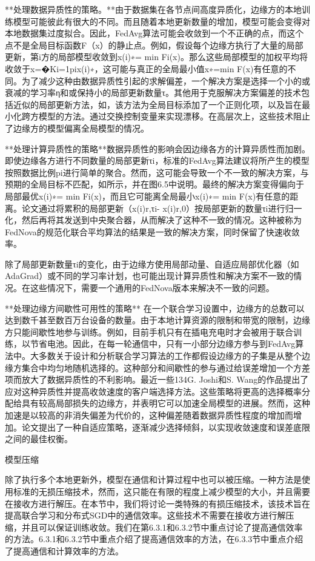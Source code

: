 **处理数据异质性的策略。**由于数据集在各节点间高度异质化，边缘方的本地训练模型可能彼此有很大的不同。而且随着本地更新数量的增加，模型可能会变得对本地数据集过度拟合。因此，FedAvg算法可能会收敛到一个不正确的点，而这个点不是全局目标函数F（x）的静止点。例如，假设每个边缘方执行了大量的局部更新，第i方的局部模型收敛到x(i)∗= min Fi(x)。那么这些局部模型的加权平均将收敛于x=�Ki=1pix(i)∗，这可能与真正的全局最小值x∗=min F(x)有任意的不同。为了减少这种由数据异质性引起的求解偏差，一个解决方案是选择一个小的或衰减的学习率η和或保持小的局部更新数量τ。其他用于克服解决方案偏差的技术包括近似的局部更新方法，如，该方法为全局目标添加了一个正则化项，以及旨在最小化跨方模型的方法。通过交换控制变量来实现漂移。在高层次上，这些技术阻止了边缘方的模型偏离全局模型的情况。

**处理计算异质性的策略**数据异质性的影响会因边缘各方的计算异质性而加剧。即使边缘各方进行不同数量的局部更新τi，标准的FedAvg算法建议将所产生的模型按照数据比例pi进行简单的聚合。然而，这可能会导致一个不一致的解决方案，与预期的全局目标不匹配，如所示，并在图6.5中说明。最终的解决方案变得偏向于局部最优x(i)∗= min Fi(x)，而且它可能离全局最小x(i)∗= min F(x)有任意的距离。论文通过将累积的局部更新（x(i)r,τi- x(i)r,0）按局部更新的数量τi进行归一化，然后再将其发送到中央聚合器，从而解决了这种不一致的情况。这种被称为FedNova的规范化联合平均算法的结果是一致的解决方案，同时保留了快速收敛率。

除了局部更新数量τi的变化，由于边缘方使用局部动量、自适应局部优化器（如AdaGrad）或不同的学习率计划，也可能出现计算异质性和解决方案不一致的情况。在这些情况下，需要一个通用的FedNova版本来解决不一致的问题。

**处理边缘方间歇性可用性的策略** 在一个联合学习设置中，边缘方的总数可以达到数千甚至数百万台设备的数量。由于本地计算资源的限制和带宽的限制，边缘方只能间歇性地参与训练。例如，目前手机只有在插电充电时才会被用于联合训练，以节省电池。因此，在每一轮通信中，只有一小部分边缘方参与到FedAvg算法中。大多数关于设计和分析联合学习算法的工作都假设边缘方的子集是从整个边缘方集合中均匀地随机选择的。这种部分和间歇性的参与通过给误差增加一个方差项而放大了数据异质性的不利影响。最近一些134G. Joshi和S. Wang的作品提出了应对这种异质性并提高收敛速度的客户端选择方法。这些策略将更高的选择概率分配给具有较高局部损失的边缘方，并表明它可以加速全局模型的进展。然而，这种加速是以较高的非消失偏差为代价的，这种偏差随着数据异质性程度的增加而增加。论文提出了一种自适应策略，逐渐减少选择倾斜，以实现收敛速度和误差底限之间的最佳权衡。

模型压缩

除了执行多个本地更新外，模型在通信和计算过程中也可以被压缩。一种方法是使用标准的无损压缩技术，然而，这只能在有限的程度上减少模型的大小，并且需要在接收方进行解压。在本节中，我们将讨论一类特殊的有损压缩技术，该技术旨在提高联合学习和分布式SGD中的通信效率。这些技术不需要在接收方进行解压缩，并且可以保证训练收敛。我们在第6.3.1和6.3.2节中重点讨论了提高通信效率的方法。6.3.1和6.3.2节中重点介绍了提高通信效率的方法，在6.3.3节中重点介绍了提高通信和计算效率的方法。


